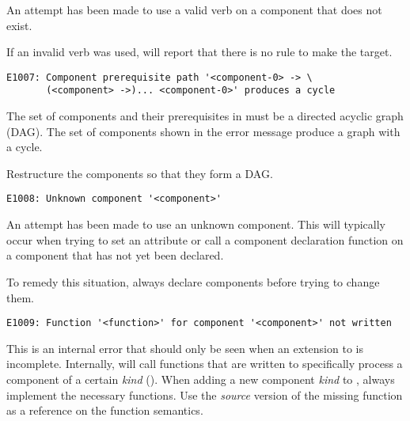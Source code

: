 An attempt has been made to use a valid \lmsbw verb on a component
that does not exist.

If an invalid verb was used, \lmsbw will report that there is no rule
to make the target.


\begin{footnotesize}
\begin{verbatim}
E1007: Component prerequisite path '<component-0> -> \
       (<component> ->)... <component-0>' produces a cycle
\end{verbatim}
\end{footnotesize}

The set of components and their prerequisites in \lmsbw must be a
directed acyclic graph (DAG).  The set of components shown in the
error message produce a graph with a cycle.

Restructure the components so that they form a DAG.


\begin{footnotesize}
\begin{verbatim}
E1008: Unknown component '<component>'
\end{verbatim}
\end{footnotesize}

An attempt has been made to use an unknown component.  This will
typically occur when trying to set an attribute or call a component
declaration function on a component that has not yet been declared.

To remedy this situation, always declare components before trying to
change them.


\begin{footnotesize}
\begin{verbatim}
E1009: Function '<function>' for component '<component>' not written
\end{verbatim}
\end{footnotesize}

This is an internal error that should only be seen when an extension
to \lmsbw is incomplete.  Internally, \lmsbw will call functions that
are written to specifically process a component of a certain
\emph{kind} ().  When adding a new component
\emph{kind} to \lmsbw, always implement the necessary functions.  Use
the \emph{source} version of the missing function as a reference on
the function semantics.


